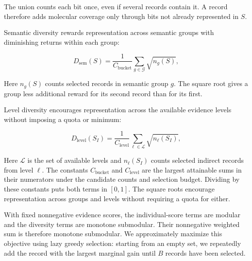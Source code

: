 The union counts each bit once, even if several records contain it. A record therefore adds molecular coverage only through bits not already represented in $S$.

Semantic diversity rewards representation across semantic groups with diminishing returns within each group:

\begin{equation}
D_{\mathrm{sem}}(S)
=
\frac{1}{C_{\mathrm{bucket}}}
\sum_{g\in\mathcal{G}}\sqrt{n_g(S)},
\label{eq:semantic-diversity}
\end{equation}

Here $n_g(S)$ counts selected records in semantic group $g$. The square root gives a group less additional reward for its second record than for its first.

Level diversity encourages representation across the available evidence levels without imposing a quota or minimum:

\begin{equation}
D_{\mathrm{level}}(S_I)
=
\frac{1}{C_{\mathrm{level}}}
\sum_{\ell\in\mathcal{L}}\sqrt{n_\ell(S_I)},
\label{eq:level-diversity}
\end{equation}

Here $\mathcal{L}$ is the set of available levels and $n_\ell(S_I)$ counts selected indirect records from level $\ell$. The constants $C_{\mathrm{bucket}}$ and $C_{\mathrm{level}}$ are the largest attainable sums in their numerators under the candidate counts and selection budget. Dividing by these constants puts both terms in $[0,1]$. The square roots encourage representation across groups and levels without requiring a quota for either.

With fixed nonnegative evidence scores, the individual-score terms are modular and the diversity terms are monotone submodular. Their nonnegative weighted sum is therefore monotone submodular. We approximately maximize this objective using lazy greedy selection: starting from an empty set, we repeatedly add the record with the largest marginal gain until $B$ records have been selected.
